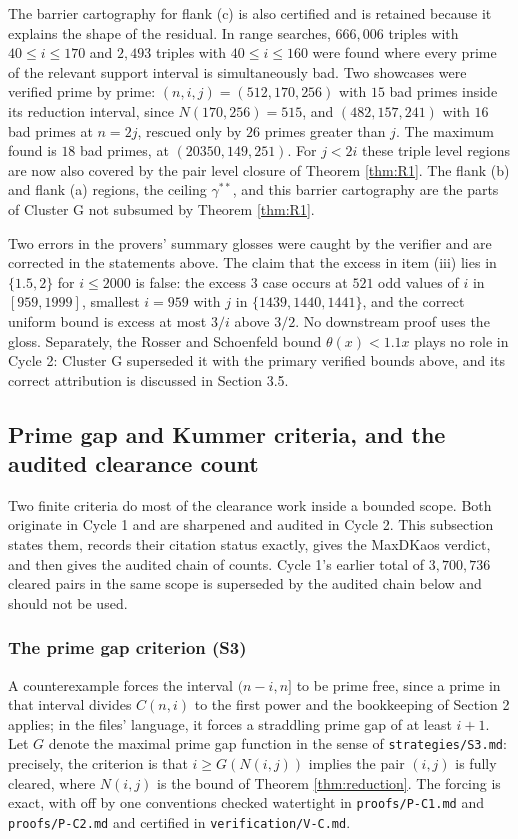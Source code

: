 \documentclass[11pt]{article}
\theoremstyle{remark}
\begin{document}
The barrier cartography for flank (c) is also certified and is retained because it explains the shape of the residual. In range searches, $666{,}006$ triples with $40\le i\le 170$ and $2{,}493$ triples with $40\le i\le 160$ were found where every prime of the relevant support interval is simultaneously bad. Two showcases were verified prime by prime: $(n,i,j)=(512,170,256)$ with $15$ bad primes inside its reduction interval, since $N(170,256)=515$, and $(482,157,241)$ with $16$ bad primes at $n=2j$, rescued only by $26$ primes greater than $j$. The maximum found is $18$ bad primes, at $(20350,149,251)$. For $j<2i$ these triple level regions are now also covered by the pair level closure of Theorem \ref{thm:R1}. The flank (b) and flank (a) regions, the ceiling $\gamma^{**}$, and this barrier cartography are the parts of Cluster G not subsumed by Theorem \ref{thm:R1}.

Two errors in the provers' summary glosses were caught by the verifier and are corrected in the statements above. The claim that the excess in item (iii) lies in $\{1.5,2\}$ for $i\le 2000$ is false: the excess $3$ case occurs at $521$ odd values of $i$ in $[959,1999]$, smallest $i=959$ with $j$ in $\{1439,1440,1441\}$, and the correct uniform bound is excess at most $3/i$ above $3/2$. No downstream proof uses the gloss. Separately, the Rosser and Schoenfeld bound $\theta(x)<1.1x$ plays no role in Cycle 2: Cluster G superseded it with the primary verified bounds above, and its correct attribution is discussed in Section 3.5.


\subsection{Prime gap and Kummer criteria, and the audited clearance count}

Two finite criteria do most of the clearance work inside a bounded scope. Both originate in Cycle 1 and are sharpened and audited in Cycle 2. This subsection states them, records their citation status exactly, gives the MaxDKaos verdict, and then gives the audited chain of counts. Cycle 1's earlier total of $3{,}700{,}736$ cleared pairs in the same scope is superseded by the audited chain below and should not be used.

\subsubsection{The prime gap criterion (S3)}

A counterexample forces the interval $(n-i,n]$ to be prime free, since a prime in that interval divides $C(n,i)$ to the first power and the bookkeeping of Section 2 applies; in the files' language, it forces a straddling prime gap of at least $i+1$. Let $G$ denote the maximal prime gap function in the sense of \texttt{strategies/S3.md}: precisely, the criterion is that $i\ge G(N(i,j))$ implies the pair $(i,j)$ is fully cleared, where $N(i,j)$ is the bound of Theorem \ref{thm:reduction}. The forcing is exact, with off by one conventions checked watertight in \texttt{proofs/P-C1.md} and \texttt{proofs/P-C2.md} and certified in \texttt{verification/V-C.md}.
\end{document}
